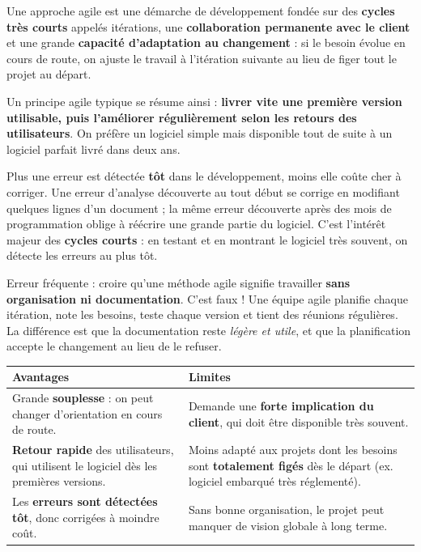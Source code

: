 \documentclass[11pt]{article}
\newcommand{\cle}[1]{{\popxbold\color{popdark}#1}}
\newcounter{popsec}
\newcounter{popsub}
\newcommand{\courssub}[1]{%
  \stepcounter{popsub}%
  \par\vspace{9pt}\noindent{\popxbold\fontsize{11.5}{13}\selectfont\color{popink}{\color{poporange}\thepopsec.\thepopsub}\hspace{6pt}#1}\par\nopagebreak\vspace{4pt}
}
\begin{document}
\begin{definition}
Une \cle{approche agile} est une démarche de développement fondée sur des \textbf{cycles très courts} appelés \cle{itérations}, une \textbf{collaboration permanente avec le client} et une grande \textbf{capacité d'adaptation au changement} : si le besoin évolue en cours de route, on ajuste le travail à l'itération suivante au lieu de figer tout le projet au départ.
\end{definition}

Un principe agile typique se résume ainsi : \textbf{livrer vite une première version utilisable, puis l'améliorer régulièrement selon les retours des utilisateurs}. On préfère un logiciel simple mais disponible tout de suite à un logiciel parfait livré dans deux ans.

\begin{propriete}
Plus une erreur est détectée \textbf{tôt} dans le développement, moins elle coûte cher à corriger. Une erreur d'analyse découverte au tout début se corrige en modifiant quelques lignes d'un document ; la même erreur découverte après des mois de programmation oblige à réécrire une grande partie du logiciel. C'est l'intérêt majeur des \textbf{cycles courts} : en testant et en montrant le logiciel très souvent, on détecte les erreurs au plus tôt.
\end{propriete}

\begin{attention}
Erreur fréquente : croire qu'une méthode agile signifie travailler \textbf{sans organisation ni documentation}. C'est faux ! Une équipe agile planifie chaque itération, note les besoins, teste chaque version et tient des réunions régulières. La différence est que la documentation reste \emph{légère et utile}, et que la planification accepte le changement au lieu de le refuser.
\end{attention}

\courssub{Avantages et limites}

\begin{center}
\begin{tabularx}{\linewidth}{|X|X|}
\hline
\rowcolor{popblueL} \textbf{Avantages} & \textbf{Limites} \\
\hline
Grande \textbf{souplesse} : on peut changer d'orientation en cours de route. & Demande une \textbf{forte implication du client}, qui doit être disponible très souvent. \\
\hline
\textbf{Retour rapide} des utilisateurs, qui utilisent le logiciel dès les premières versions. & Moins adapté aux projets dont les besoins sont \textbf{totalement figés} dès le départ (ex. logiciel embarqué très réglementé). \\
\hline
Les \textbf{erreurs sont détectées tôt}, donc corrigées à moindre coût. & Sans bonne organisation, le projet peut manquer de vision globale à long terme. \\
\hline
\end{tabularx}
\end{center}
\end{document}

